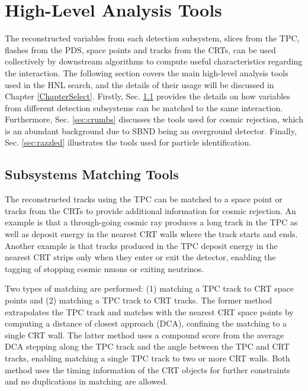 \section{High-Level Analysis Tools}
\label{sec:reco_ana_tools}

The reconstructed variables from each detection subsystem, slices from the TPC, flashes from the PDS, space points and tracks from the CRTs, can be used collectively by downstream algorithms to compute 
useful characteristics regarding the interaction.
The following section covers the main high-level analysis tools used in the HNL search, and the details of their usage will be discussed in Chapter \ref{ChapterSelect}.
Firstly, Sec. \ref{sec:subsystem_match} provides the details on how variables from different detection subsystems can be matched to the same interaction.
Furthermore, Sec. \ref{sec:crumbs} discusses the tools used for cosmic rejection, which is an abundant background due to SBND being an overground detector.                                                 
Finally, Sec. \ref{sec:razzled} illustrates the tools used for particle identification.

\subsection{Subsystems Matching Tools}
\label{sec:subsystem_match}

The reconstructed tracks using the TPC can be matched to a space point or tracks from the CRTs to provide additional information for cosmic rejection.
An example is that a through-going cosmic ray produces a long track in the TPC as well as deposit energy
 in the nearest CRT walls where the track starts and ends. 
Another example is that tracks produced in the TPC deposit energy in the nearest CRT strips only when they enter or exit the detector, enabling the tagging of stopping cosmic muons or exiting neutrinos.

Two types of matching are performed: (1) matching a TPC track to CRT space points and (2) matching a TPC track to CRT tracks.
The former method extrapolates the TPC track and matches with the nearest CRT space points by computing a distance of closest approach (DCA), confining the matching to a single CRT wall. 
The latter method uses a compound score from the average DCA stepping along the TPC track and the angle 
between the TPC and CRT tracks, enabling matching a single TPC track to two or more CRT walls.
Both method uses the timing information of the CRT objects for further constraints and no duplications in matching are allowed.

